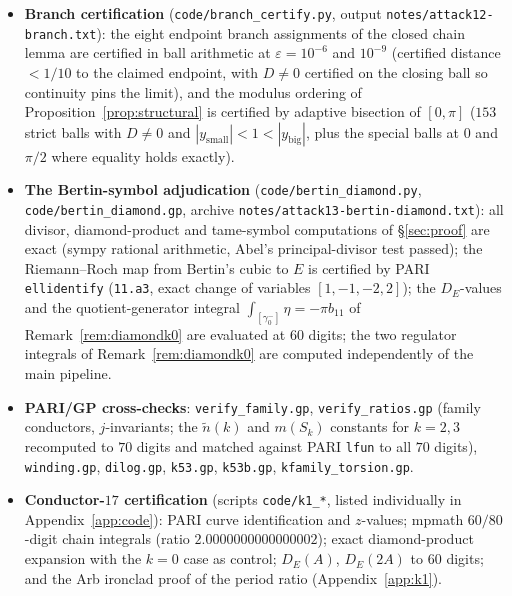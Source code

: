 \documentclass[preprint,12pt]{elsarticle}
\theoremstyle{definition}
\theoremstyle{remark}
\begin{document}
\begin{itemize}
  constant $\kappa=1$ is an \emph{exact rational identity}
  (\texttt{code/kappa\_exact.py}): an explicit birational map to the minimal
  model, derived by Riemann--Roch and composed with PARI's exact minimal
  transform, satisfies $2Y+1=u\,dX/dx$ as a polynomial identity, hence
  $\omega_{\min}=dX/(2Y+1)=dx/u$ exactly (sympy-verified, including the
  inverse round-trip).
  \item \textbf{Branch certification} (\texttt{code/branch\_certify.py},
  output \texttt{notes/attack12-branch.txt}): the eight endpoint branch
  assignments of the closed chain lemma are certified in ball arithmetic at
  $\varepsilon=10^{-6}$ and $10^{-9}$ (certified distance $<1/10$ to the
  claimed endpoint, with $D\ne0$ certified on the closing ball so continuity
  pins the limit), and the modulus ordering of
  Proposition~\ref{prop:structural} is certified by adaptive bisection of
  $[0,\pi]$ ($153$ strict balls with $D\ne0$ and
  $|y_{\mathrm{small}}|<1<|y_{\mathrm{big}}|$, plus the special balls at $0$
  and $\pi/2$ where equality holds exactly).
  \item \textbf{The Bertin-symbol adjudication} (\texttt{code/bertin\_diamond.py},
  \texttt{code/bertin\_diamond.gp}, archive
  \texttt{notes/attack13-bertin-diamond.txt}):
  \begingroup\sloppy
  all divisor, diamond-product
  and tame-symbol computations of \S\ref{sec:proof} are exact (sympy rational
  arithmetic, Abel's principal-divisor test passed); the Riemann--Roch map
  from Bertin's cubic to $E$ is certified by PARI \texttt{ellidentify}
  (\texttt{11.a3}, exact change of variables $[1,-1,-2,2]$); the $D_E$-values
  and the quotient-generator integral $\int_{[\gamma^-_0]}\eta=-\pi b_{11}$
  of Remark~\ref{rem:diamondk0} are evaluated at $60$ digits; the
  two regulator integrals of Remark~\ref{rem:diamondk0} are computed
  independently of the main pipeline.
  \par\endgroup
  \item \textbf{PARI/GP cross-checks}: \texttt{verify\_family.gp},
  \texttt{verify\_ratios.gp} (family conductors, $j$-invariants; the
  $\tilde n(k)$ and $m(S_k)$ constants for $k=2,3$ recomputed to $70$ digits
  and matched against PARI \texttt{lfun} to all $70$ digits), \texttt{winding.gp},
  \texttt{dilog.gp}, \texttt{k53.gp}, \texttt{k53b.gp},
  \texttt{kfamily\_torsion.gp}.
  \item \textbf{Conductor-$17$ certification} (scripts \texttt{code/k1\_*},
  listed individually in Appendix~\ref{app:code}): PARI curve identification
  and $z$-values; mpmath $60/80$-digit chain integrals (ratio
  $2.0000000000000002$); exact diamond-product expansion with the $k=0$ case
  as control; $D_E(A)$, $D_E(2A)$ to $60$ digits; and the Arb ironclad proof
  of the period ratio (Appendix~\ref{app:k1}).
\end{itemize}
\end{document}
